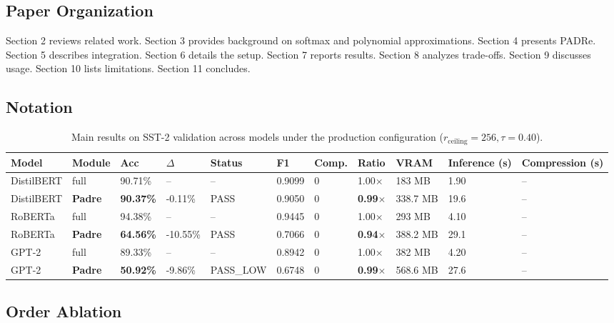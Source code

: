 \subsection{Paper Organization}

Section 2 reviews related work. Section 3 provides background on softmax 
and polynomial approximations. Section 4 presents PADRe. Section 5 describes 
integration. Section 6 details the setup. Section 7 reports results. Section 
8 analyzes trade-offs. Section 9 discusses usage. Section 10 lists 
limitations. Section 11 concludes.



\subsection{Notation}

\begin{table}[t]
\centering
\small
\begin{tabular}{lllllllllll}
\toprule
\textbf{Model} & \textbf{Module} & \textbf{Acc} & \textbf{$\Delta$} & \textbf{Status} & \textbf{F1} & \textbf{Comp.} & \textbf{Ratio} & \textbf{VRAM} & \textbf{Inference (s)} & \textbf{Compression (s)} \\
\midrule
DistilBERT & full & 90.71\% & -- & -- & 0.9099 & 0 & 1.00$\times$ & 183 MB & 1.90 & -- \\
DistilBERT & \textbf{Padre} & \textbf{90.37\%} & -0.11\% & PASS & 0.9050 & 0 & \textbf{0.99$\times$} & 338.7 MB & 19.6 & -- \\
RoBERTa & full & 94.38\% & -- & -- & 0.9445 & 0 & 1.00$\times$ & 293 MB & 4.10 & -- \\
RoBERTa & \textbf{Padre} & \textbf{64.56\%} & -10.55\% & PASS & 0.7066 & 0 & \textbf{0.94$\times$} & 388.2 MB & 29.1 & -- \\
GPT-2 & full & 89.33\% & -- & -- & 0.8942 & 0 & 1.00$\times$ & 382 MB & 4.20 & -- \\
GPT-2 & \textbf{Padre} & \textbf{50.92\%} & -9.86\% & PASS_LOW & 0.6748 & 0 & \textbf{0.99$\times$} & 568.6 MB & 27.6 & -- \\
\bottomrule
\end{tabular}
\caption{Main results on SST-2 validation across models under the production configuration ($r_{\mathrm{ceiling}}=256, \tau=0.40$).}
\label{tab:main_sst2}
\end{table}

\subsection{Order Ablation}

